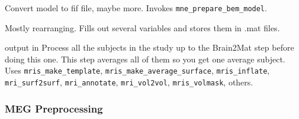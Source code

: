 \documentclass[11pt]{article}
\begin{document}
\begin{itemize}
Convert  model to fif file, maybe more.
  Invokes \verb+mne_prepare_bem_model+.

  Mostly rearranging.
Fills out several variables and stores them in .mat files.

%
{output in }  Process all the subjects in the
study up to the Brain2Mat step before doing this one.  This step
averages all of them so you get one average subject.  Uses
\verb+mris_make_template+,
  \verb+mris_make_average_surface+, \verb+mris_inflate+,
  \verb+mri_surf2surf+, \verb+mri_annotate+, \verb+mri_vol2vol+,
  \verb+mris_volmask+, others.

\end{itemize}

\subsubsection{MEG Preprocessing}
\end{document}
